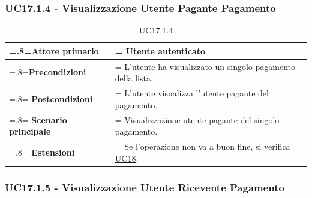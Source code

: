         \subsubsection{UC17.1.4 - Visualizzazione Utente Pagante Pagamento}
        \label{UC17.1.4}

            \begin{table}[H]
                \centering
                \renewcommand{\arraystretch}{1.8}
                \renewcommand\tabularxcolumn[1]{m{#1}}
                \begin{tabularx}{0.9\textwidth} {
                    >{\hsize=.8\hsize\linewidth=\hsize}X
                    >{\hsize=1.2\hsize\linewidth=\hsize}X}
                    \hline
                    \textbf{Attore primario} & Utente autenticato \\
                    \hline
                    \textbf{Precondizioni} & L'utente ha visualizzato un singolo pagamento della lista. \\
                    \hline
                    \textbf{Postcondizioni} & L'utente visualizza l'utente pagante del pagamento. \\
                    \hline
                    \textbf{Scenario principale} & Visualizzazione utente pagante del singolo pagamento. \\
                    \hline
                    \textbf{Estensioni} & Se l'operazione non va a buon fine, si verifica \hyperref[UC18]{UC18}. \\
                    \hline
                \end{tabularx}
                \caption{UC17.1.4}
            \end{table}

        \subsubsection{UC17.1.5 - Visualizzazione Utente Ricevente Pagamento}
        \label{UC17.1.5}

